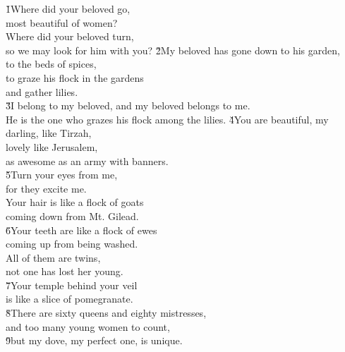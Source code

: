 
\begin{poetry}
\poeml {}
\v{1}Where did your beloved go, \\
\poeml most beautiful of women? \\
\poeml Where did your beloved turn, \\
\poeml so we may look for him with you?
\poeml \v{2}My beloved has gone down to his garden, \\
\poemll    to the beds of spices, \\
\poeml to graze his flock in the gardens \\
\poemll    and gather lilies. \\
\poeml \v{3}I belong to my beloved, and my beloved belongs to me. \\
\poemll    He is the one who grazes his flock among the lilies.
\poeml \v{4}You are beautiful, my darling, like Tirzah, \\
\poemll    lovely like Jerusalem, \\
\poemlll       as awesome as an army with banners. \\
\poeml \v{5}Turn your eyes from me, \\
\poemll    for they excite me. \\
\poeml Your hair is like a flock of goats \\
\poemll    coming down from Mt. Gilead. \\
\poeml \v{6}Your teeth are like a flock of ewes \\
\poemll    coming up from being washed. \\
\poeml All of them are twins, \\
\poemll    not one has lost her young. \\
\poeml \v{7}Your temple behind your veil \\
\poemll    is like a slice of pomegranate. \\
\poeml \v{8}There are sixty queens and eighty mistresses, \\
\poemll    and too many young women to count, \\
\poeml \v{9}but my dove, my perfect one, is unique. \\

\end{poetry}

